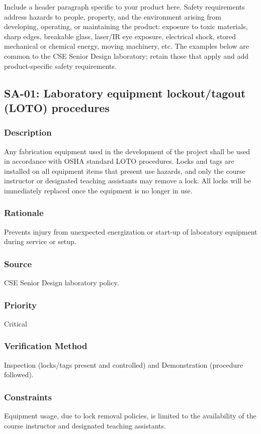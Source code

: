 Include a header paragraph specific to your product here. Safety requirements address hazards to people, property, and the environment arising from developing, operating, or maintaining the product: exposure to toxic materials, sharp edges, breakable glass, laser/IR eye exposure, electrical shock, stored mechanical or chemical energy, moving machinery, etc. The examples below are common to the CSE Senior Design laboratory; retain those that apply and add product-specific safety requirements.

\subsection{SA-01: Laboratory equipment lockout/tagout (LOTO) procedures}
\subsubsection{Description}
Any fabrication equipment used in the development of the project shall be used in accordance with OSHA standard LOTO procedures. Locks and tags are installed on all equipment items that present use hazards, and only the course instructor or designated teaching assistants may remove a lock. All locks will be immediately replaced once the equipment is no longer in use.
\subsubsection{Rationale}
Prevents injury from unexpected energization or start-up of laboratory equipment during service or setup.
\subsubsection{Source}
CSE Senior Design laboratory policy.
\subsubsection{Priority}
Critical
\subsubsection{Verification Method}
Inspection (locks/tags present and controlled) and Demonstration (procedure followed).
\subsubsection{Constraints}
Equipment usage, due to lock removal policies, is limited to the availability of the course instructor and designated teaching assistants.
